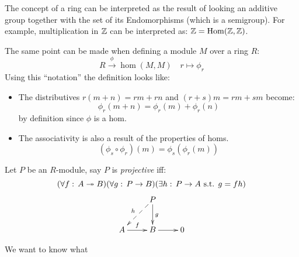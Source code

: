 The concept of a ring can be interpreted as the result of looking an additive group together with the set of its Endomorphisms (which is a semigroup). For example, multiplication in $\mathbb{Z}$ can be interpreted as: $\mathbb{Z}=\operatorname{Hom}(\mathbb{Z},\mathbb{Z})$.

The same point can be made when defining a module $M$ over a ring $R$:
$$ R\xrightarrow{\phi} \hom(M,M)\quad r\mapsto \phi_r$$
Using this ``notation'' the definition looks like:
\begin{itemize}
\item The distributives $r(m+n)=rm+rn$ and $(r+s)m = rm+sm$ become:
$$\phi_r(m+n) = \phi_r(m) + \phi_r(n)$$
by definition since $\phi$ is a hom.
\item The associativity is also a result of the properties of homs.
$$(\phi_s\circ \phi_r)(m) = \phi_s(\phi_r(m))$$
\end{itemize}

\begin{ddef}
Let $P$ be  an $R$-module, say $P$ is \emph{projective} iff:
$$(\forall f:\, A \twoheadrightarrow B)(\forall g:\, P\to B)(\exists h:\, P\to A \text{ s.t. } g=fh )$$
\[\xymatrix{
            &  P\ar[d]^g\ar@{-->}[dl]_h &       \\
A \ar[r]^f  &  B \ar[r]          & 0     } \]
\end{ddef}

We want to know what 
